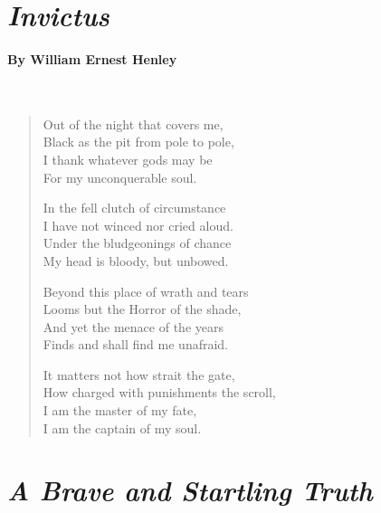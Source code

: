 \newpage
\section*{\emph{Invictus}}
\paragraph{By William Ernest Henley}~
\begin{verse}
	Out of the night that covers me,\\
	\hspace{1em}Black as the pit from pole to pole,\\
	I thank whatever gods may be\\
	\hspace{1em}For my unconquerable soul.

	In the fell clutch of circumstance\\
	\hspace{1em}I have not winced nor cried aloud.\\
	Under the bludgeonings of chance\\
	\hspace{1em}My head is bloody, but unbowed.

	Beyond this place of wrath and tears\\
	\hspace{1em}Looms but the Horror of the shade,\\
	And yet the menace of the years\\
	\hspace{1em}Finds and shall find me unafraid.

	It matters not how strait the gate,\\
	\hspace{1em}How charged with punishments the scroll,\\
	I am the master of my fate,\\
	\hspace{1em}I am the captain of my soul.
\end{verse}

\newpage
{}
\section*{\emph{A Brave and Startling Truth}}
